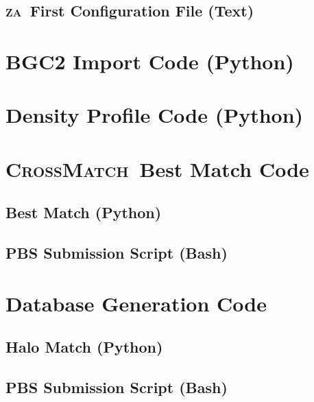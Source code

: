 \documentclass[12pt]{report}
\newcommand{\za}{\textsc{za}}
\newcommand{\crossmatch}{\textsc{CrossMatch}}
\begin{document}
\begin{appendices}
	\section{\za\ First Configuration File (Text)}
	\label{app:crossmatch_za_config}
	

	\chapter{BGC2 Import Code (Python)}
	\label{app:bgc2}
	

	\chapter{Density Profile Code (Python)}
	\label{app:density_profile}
	

	\chapter{\crossmatch\ Best Match Code}
	\label{app:crossmatch_best_match}
	\section{Best Match (Python)}
	\label{app:best_match}
	
	\section{PBS Submission Script (Bash)}
	\label{app:run_best_match}
	

	\chapter{Database Generation Code}
	\label{app:database_generation}
	\section{Halo Match (Python)}
	\label{app:match_halos}
	
	\section{PBS Submission Script (Bash)}
	\label{app:run_match}
	


\end{appendices}
\end{document}
